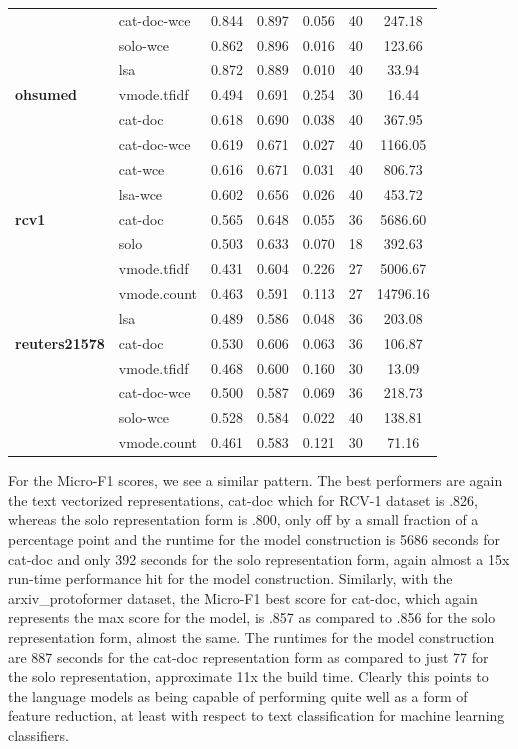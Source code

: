 \documentclass[final]{clv2025-revised}
\begin{document}
\begin{table}[h!]
\begin{tabular}{@{}p{2.2cm} p{2.6cm} c c c c c@{}}
 & cat-doc-wce & 0.844 & 0.897 & 0.056 & 40 & 247.18 \\
 & solo-wce & 0.862 & 0.896 & 0.016 & 40 & 123.66 \\
 & lsa & 0.872 & 0.889 & 0.010 & 40 & 33.94 \\
\midrule
\textbf{ohsumed} & vmode.tfidf & 0.494 & 0.691 & 0.254 & 30 & 16.44 \\
 & cat-doc & 0.618 & 0.690 & 0.038 & 40 & 367.95 \\
 & cat-doc-wce & 0.619 & 0.671 & 0.027 & 40 & 1166.05 \\
 & cat-wce & 0.616 & 0.671 & 0.031 & 40 & 806.73 \\
 & lsa-wce & 0.602 & 0.656 & 0.026 & 40 & 453.72 \\
\midrule
\textbf{rcv1} & cat-doc & 0.565 & 0.648 & 0.055 & 36 & 5686.60 \\
 & solo & 0.503 & 0.633 & 0.070 & 18 & 392.63 \\
 & vmode.tfidf & 0.431 & 0.604 & 0.226 & 27 & 5006.67 \\
 & vmode.count & 0.463 & 0.591 & 0.113 & 27 & 14796.16 \\
 & lsa & 0.489 & 0.586 & 0.048 & 36 & 203.08 \\
\midrule
\textbf{reuters21578} & cat-doc & 0.530 & 0.606 & 0.063 & 36 & 106.87 \\
 & vmode.tfidf & 0.468 & 0.600 & 0.160 & 30 & 13.09 \\
 & cat-doc-wce & 0.500 & 0.587 & 0.069 & 36 & 218.73 \\
 & solo-wce & 0.528 & 0.584 & 0.022 & 40 & 138.81 \\
 & vmode.count & 0.461 & 0.583 & 0.121 & 30 & 71.16 \\
\bottomrule
\end{tabular}
\end{table}

For the Micro-F1 scores, we see a similar pattern. The best performers are again the text vectorized representations, cat-doc which for RCV-1 dataset is .826, whereas the solo representation form is .800, only off by a small fraction of a percentage point and the runtime for the model construction is 5686 seconds for cat-doc and only 392 seconds for the solo representation form, again almost a 15x run-time performance hit for the model construction. Similarly, with the arxiv\_protoformer dataset, the Micro-F1 best score for cat-doc, which again represents the max score for the model, is .857 as compared to .856 for the solo representation form, almost the same. The runtimes for the model construction are 887 seconds for the cat-doc representation form as compared to just 77 for the solo representation, approximate 11x the build time. Clearly this points to the language models as being capable of performing quite well as a form of feature reduction, at least with respect to text classification for machine learning classifiers.
\end{document}
